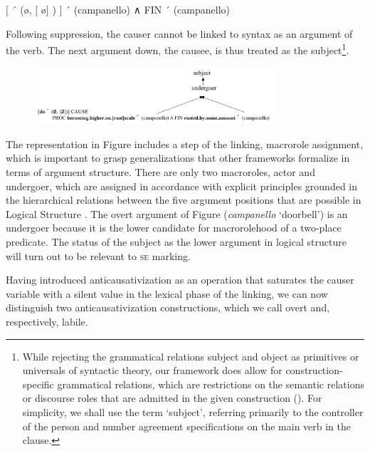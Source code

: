 \documentclass[output=paper,colorlinks,citecolor=brown
]{langscibook}
\begin{document}
\ea  \label{bentley_example_50}
    $\lbrack$ ´ (\o, $\lbrack$ \o $\rbrack$ ) $\rbrack$ ´ (campanello) ∧ FIN ´ (campanello)
\z

Following suppression, the causer cannot be linked to syntax as an argument of the verb. The next argument down, the causee, is thus treated as the subject\footnote{While rejecting the grammatical relations subject and object as primitives or universals of syntactic theory, our framework does allow for construction-specific grammatical relations, which are restrictions on the semantic relations or discourse roles that are admitted in the given construction (\cites[242—309]{vanvalin2023principles}{lapolla2023grammatical}). For simplicity, we shall use the term ‘subject’, referring primarily to the controller of the person and number agreement specifications on the main verb in the clause.}.

\begin{figure}
\centering
\includegraphics[width=0.8\textwidth]{figures/bentley_figure3.png}
\caption{}
\label{fig:bentley_figure_3}
\end{figure}    


The representation in Figure  includes a step of the linking, macrorole assignment, which is important to grasp generalizations that other frameworks formalize in terms of argument structure. There are only two macroroles, actor and undergoer, which are assigned in accordance with explicit principles grounded in the hierarchical relations between the five argument positions that are possible in Logical Structure \citep[82—198]{vanvalin1997syntax}. The overt argument of Figure  (\textit{campanello} ‘doorbell’) is an undergoer because it is the lower candidate for macrorolehood of a two-place predicate. The status of the subject as the lower argument in logical structure will turn out to be relevant to \textsc{se} marking. 

Having introduced anticausativization as an operation that saturates the causer variable with a silent value in the lexical phase of the linking, we can now distinguish two anticausativization constructions, which we call overt and, respectively, labile. 
\end{document}
